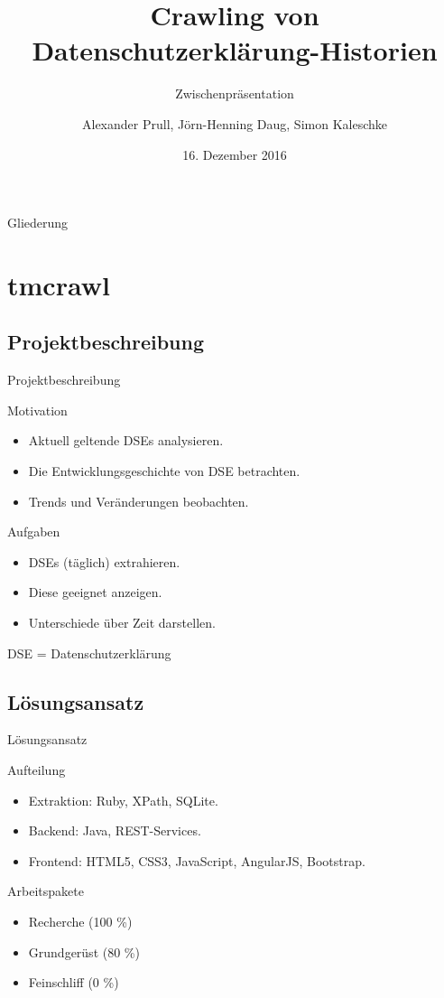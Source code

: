\documentclass[halfparskip]{beamer}
\title{Crawling von Datenschutzerklärung-Historien}
\subtitle{Zwischenpräsentation}
\author[AP, JHD, SK]{Alexander Prull, Jörn-Henning Daug, Simon Kaleschke}
\institute{Universität Leipzig}
\date[16. 12. 2016]{16. Dezember 2016}
\begin{document}
\begin{frame}
  \titlepage
\end{frame}

\begin{frame}{Gliederung}
  \tableofcontents
\end{frame}

\section{tmcrawl}
\subsection{Projektbeschreibung}
\begin{frame}{Projektbeschreibung}
	\begin{block}{Motivation}
	\begin{itemize}[label=$\bullet$]
	\item Aktuell geltende DSEs analysieren.
	\item Die Entwicklungsgeschichte von DSE betrachten.
	\item Trends und Veränderungen beobachten.
	\end{itemize}
	\end{block}
	\begin{block}{Aufgaben}
		\begin{itemize}[label=$\bullet$]
			\item DSEs (täglich) extrahieren.
			\item Diese geeignet anzeigen.
			\item Unterschiede über Zeit darstellen.
		\end{itemize}
	\end{block}
	{\tiny DSE = Datenschutzerklärung}
\end{frame}

\subsection{Lösungsansatz}
\begin{frame}{Lösungsansatz}
	\begin{block}{Aufteilung}
		\begin{itemize}[label=$\bullet$]
			\item Extraktion: Ruby, XPath, SQLite.
			\item Backend: Java, REST-Services.
			\item Frontend: HTML5, CSS3, JavaScript, AngularJS, Bootstrap.
		\end{itemize}
	\end{block}
	\begin{block}{Arbeitspakete}
		\begin{itemize}[label=$\bullet$]
			\item Recherche (100 \%)
			\item Grundgerüst (80 \%)
			\item Feinschliff (0 \%)
		\end{itemize}
	\end{block}
\end{frame}
\end{document}
